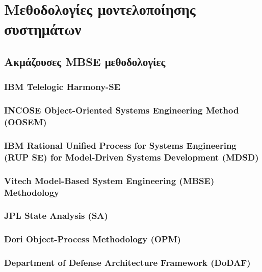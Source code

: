 \documentclass[a4paper,12pt,twoside]{report}
\begin{document}
	\chapter{Μεθοδολογίες μοντελοποίησης συστημάτων}
		\label{κεφ.:Μεθοδολογίες μοντελοποίησης συστημάτων}

		\section{Ακμάζουσες MBSE μεθοδολογίες}
		
			\subsection{IBM Telelogic Harmony-SE}
			\subsection{INCOSE Object-Oriented Systems Engineering Method (OOSEM)}
			\subsection{IBM Rational Unified Process for Systems Engineering (RUP SE) for Model-Driven Systems Development (MDSD)}
			\subsection{Vitech Model-Based System Engineering (MBSE) Methodology}
			\subsection{JPL State Analysis (SA)}
			\subsection{Dori Object-Process Methodology (OPM)}
			\subsection{Department of Defense Architecture Framework (DoDAF)}
	
\end{document}
